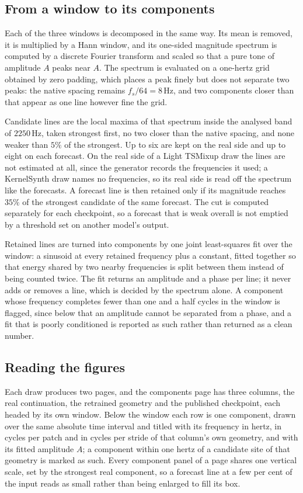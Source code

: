 \subsection{From a window to its components}

Each of the three windows is decomposed in the same way. Its mean is removed, it is multiplied by a Hann window, and its one-sided magnitude spectrum is computed by a discrete Fourier transform and scaled so that a pure tone of amplitude $A$ peaks near $A$. The spectrum is evaluated on a one-hertz grid obtained by zero padding, which places a peak finely but does not separate two peaks: the native spacing remains $f_s/64=8$\,Hz, and two components closer than that appear as one line however fine the grid.

Candidate lines are the local maxima of that spectrum inside the analysed band of $2$\textendash{}$250$\,Hz, taken strongest first, no two closer than the native spacing, and none weaker than $5\%$ of the strongest. Up to six are kept on the real side and up to eight on each forecast. On the real side of a Light TSMixup draw the lines are not estimated at all, since the generator records the frequencies it used; a KernelSynth draw names no frequencies, so its real side is read off the spectrum like the forecasts. A forecast line is then retained only if its magnitude reaches $35\%$ of the strongest candidate of the same forecast. The cut is computed separately for each checkpoint, so a forecast that is weak overall is not emptied by a threshold set on another model's output.

Retained lines are turned into components by one joint least-squares fit over the window: a sinusoid at every retained frequency plus a constant, fitted together so that energy shared by two nearby frequencies is split between them instead of being counted twice. The fit returns an amplitude and a phase per line; it never adds or removes a line, which is decided by the spectrum alone. A component whose frequency completes fewer than one and a half cycles in the window is flagged, since below that an amplitude cannot be separated from a phase, and a fit that is poorly conditioned is reported as such rather than returned as a clean number.

\subsection{Reading the figures}

Each draw produces two pages, and the components page has three columns, the real continuation, the retrained geometry and the published checkpoint, each headed by its own window. Below the window each row is one component, drawn over the same absolute time interval and titled with its frequency in hertz, in cycles per patch and in cycles per stride of that column's own geometry, and with its fitted amplitude $A$; a component within one hertz of a candidate site of that geometry is marked as such. Every component panel of a page shares one vertical scale, set by the strongest real component, so a forecast line at a few per cent of the input reads as small rather than being enlarged to fill its box.

